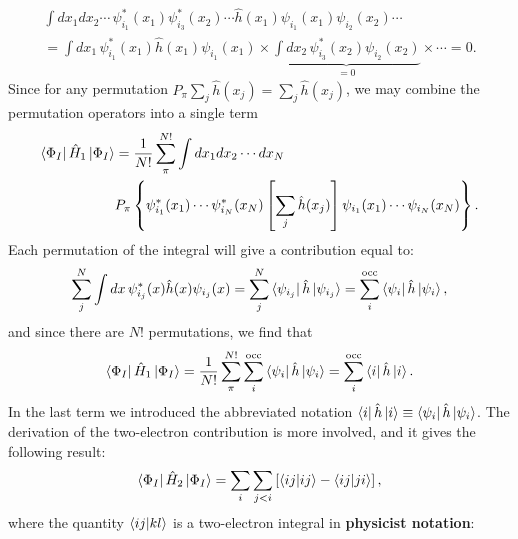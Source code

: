 \documentclass[../Main/chem532-notes.tex]{subfiles}
\begin{document}
\begin{equation}
\begin{split}
\int dx_1 dx_2 \cdots \,
\psi_{i_1}^{*}(x_1) \psi_{i_3}^{*}(x_2) \cdots
\hat{h}(x_1)
\psi_{i_1}(x_1) \psi_{i_2}(x_2) \cdots  \\
= \int dx_1 \, \psi_{i_1}^{*}(x_1) \hat{h}(x_1) \psi_{i_1}(x_1)
\times \underbrace{\int dx_2 \, \psi_{i_3}^{*}(x_2) \psi_{i_2}(x_2)}_{= 0} \times \cdots = 0.
\end{split}
\end{equation}
Since for any permutation $P_{\pi} \sum_j\hat{h}(x_j) = \sum_j\hat{h}(x_j)$, we may combine the permutation operators into a single term
\begin{equation}
\begin{split}
\bra{\Phi_I} \hat{H}_1 \ket{\Phi_I} &= \frac{1}{N!}
\sum_{\pi}^{N!} \int dx_1 dx_2 \cdots dx_N \\
&
P_{\pi}\left\{
\psi_{i_1}^{*}(x_1) \cdots \psi_{i_N}^{*}(x_N)
\left[\sum_j\hat{h}(x_j)\right]
\psi_{i_1}(x_1) \cdots \psi_{i_N}(x_N)
\right\}.
\end{split}
\end{equation}
Each permutation of the integral will give a contribution equal to:
\begin{equation}
\sum_j^{N} \int dx \, \psi_{i_j}^{*}(x) \hat{h}(x) \psi_{i_j}(x) 
= \sum_j^{N} \bra{\psi_{i_j}} \hat{h} \ket{\psi_{i_j}} = \sum_i^{\rm occ} \bra{\psi_i}\hat{h}\ket{\psi_i},
\end{equation}
and since there are $N!$ permutations, we find that 
\begin{equation}
\bra{\Phi_I} \hat{H}_1 \ket{\Phi_I} = \frac{1}{N!}
\sum_{\pi}^{N!}   \sum_i^{\rm occ} \bra{\psi_i}\hat{h}\ket{\psi_i} =  \sum_i^{\rm occ} \bra{i}\hat{h}\ket{i}.
\end{equation}
In the last term we introduced the abbreviated notation $\bra{i}\hat{h}\ket{i} \equiv \bra{\psi_i}\hat{h}\ket{\psi_i}$.
The derivation of the two-electron contribution is more involved, and it gives the following result:
\begin{equation}
\bra{\Phi_I} \hat{H}_2 \ket{\Phi_I} = \sum_{i} \sum_{j < i}
\left[ \braket{i j|i j} -  \braket{i j|j i}\right],
\end{equation}
where the quantity $\braket{i j|k l}$ is a two-electron integral in \textbf{physicist notation}:
\end{document}

